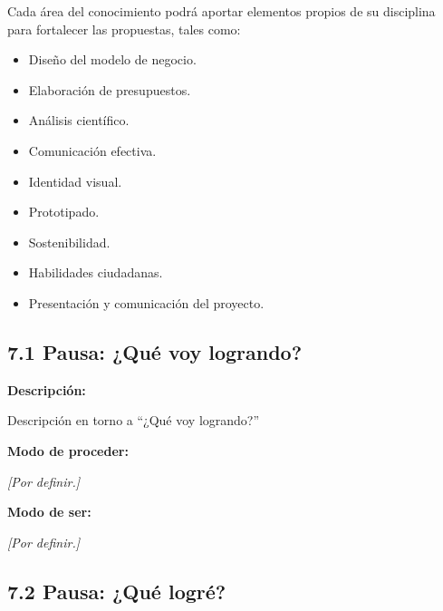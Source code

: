\documentclass[12pt,a4paper]{article}
\newcommand{\placeholder}[1]{
	\textit{\textcolor{secondary}{[#1]}}
}
\begin{document}
	Cada área del conocimiento podrá aportar elementos propios de su
	disciplina para fortalecer las propuestas, tales como:
	
	\begin{itemize}
		
		\item Diseño del modelo de negocio.
		
		\item Elaboración de presupuestos.
		
		\item Análisis científico.
		
		\item Comunicación efectiva.
		
		\item Identidad visual.
		
		\item Prototipado.
		
		\item Sostenibilidad.
		
		\item Habilidades ciudadanas.
		
		\item Presentación y comunicación del proyecto.
		
	\end{itemize}
	
	
	\subsection{7.1 Pausa: ¿Qué voy logrando?}
	
	\textbf{Descripción:}
	
	Descripción en torno a ``¿Qué voy logrando?''
	
	\vspace{0.3cm}
	
	\textbf{Modo de proceder:}
	
	\placeholder{Por definir.}
	
	\textbf{Modo de ser:}
	
	\placeholder{Por definir.}
	
	
	\subsection{7.2 Pausa: ¿Qué logré?}
	
\end{document}

